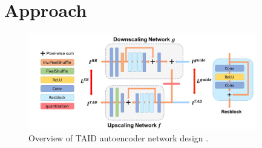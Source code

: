 \newpage
\section{Approach}
\label{sec:Approach}



\begin{figure}[!htbp]
	\centering
	\includegraphics[width=10cm]{figures/tad_overview}
	\caption{Overview of TAID autoencoder network design \cite{TAID}.}
  \label{fig:tad_overview}
\end{figure}


